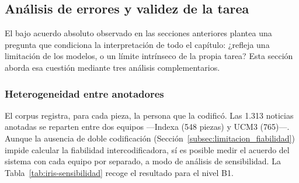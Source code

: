 \subsection{Análisis de errores y validez de la tarea}
\label{subsec:iris_errores}

El bajo acuerdo absoluto observado en las secciones anteriores plantea una
pregunta que condiciona la interpretación de todo el capítulo: ¿refleja una
limitación de los modelos, o un límite intrínseco de la propia tarea? Esta
sección aborda esa cuestión mediante tres análisis complementarios.

\subsubsection{Heterogeneidad entre anotadores}

El corpus registra, para cada pieza, la persona que la codificó. Las 1.313
noticias anotadas se reparten entre dos equipos —Indexa (548 piezas) y UCM3
(765)—. Aunque la ausencia de doble codificación
(Sección~\ref{subsec:limitacion_fiabilidad}) impide calcular la fiabilidad
intercodificadora, sí es posible medir el acuerdo del sistema con cada equipo
por separado, a modo de análisis de sensibilidad. La
Tabla~\ref{tab:iris-sensibilidad} recoge el resultado para el nivel B1.

